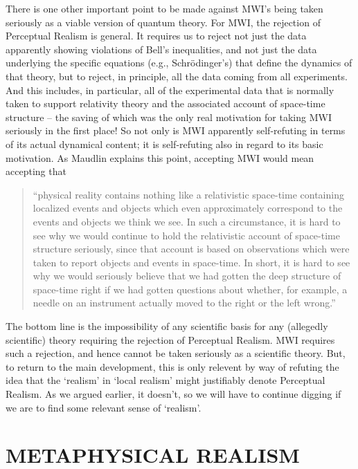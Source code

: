 \documentclass[12pt]{article}
\begin{document}
There is one other important point to be made against MWI's being
taken seriously as a viable version of quantum theory.  For MWI, the
rejection of Perceptual Realism is general.  It requires us to reject 
not just the data apparently showing violations of Bell's
inequalities, and not just the data underlying the specific equations (e.g.,
Schr\"odinger's) that define the dynamics of that theory, but to
reject, in principle, all the data coming from all experiments.  And
this includes, in particular, all of the experimental data that is
normally taken to support relativity theory and the associated account
of space-time structure -- the saving of which was the only real
motivation for taking MWI seriously in the first place!  So not only
is MWI apparently self-refuting in terms of its actual dynamical
content; it is self-refuting also in regard to its basic motivation.  
As Maudlin explains this point, accepting MWI would mean accepting that
\begin{quote}
``physical reality contains nothing like a relativistic space-time
containing localized events and objects which even approximately
correspond to the events and objects we think we see.  In such a
circumstance, it is hard to see why we would continue to hold the
relativistic account of space-time structure seriously, since that
account is based on observations which were taken to report objects
and events in space-time.  In short, it is hard to see why we would
seriously believe that we had gotten the deep structure of space-time
right if we had gotten questions about whether, for example, a needle
on an instrument actually moved to the right or the left wrong.''
\cite[page 287]{maudlin}
\end{quote}
The bottom line is the impossibility of any scientific basis for any 
(allegedly scientific) theory requiring the rejection of Perceptual
Realism.  MWI requires such a rejection, and hence cannot be taken
seriously as a scientific theory.  But, to return to the main
development, this is only relevent by way of refuting the idea that
the `realism' in `local realism' might justifiably denote Perceptual
Realism.  As we argued earlier, it doesn't, so we will have to
continue digging if we are to find some relevant sense of
`realism'.  


\section{METAPHYSICAL REALISM}
\end{document}
